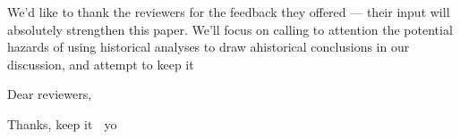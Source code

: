 \documentclass[11pt]{article}
\begin{document}
We'd like to thank the reviewers for the feedback they offered
--- their input will absolutely strengthen this paper.
We'll focus on calling to attention the potential hazards of
using historical analyses to draw ahistorical conclusions in our discussion,
and attempt to keep it 

Dear reviewers,

Thanks, keep it 💯 yo

\printbibliography{}
\end{document}
